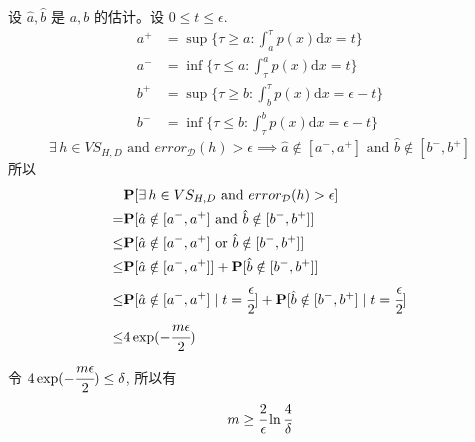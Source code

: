 \documentclass[11pt,letter,notitlepage]{article}
\begin{document}
\begin{solution}
    设 $\hat{a}, \hat{b}$ 是 $a,b$ 的估计。设 $0\leq t\leq \epsilon$.
    $$\begin{aligned}
            a^+ & =\sup \{\tau \geq a : \int_a^\tau p(x)\text{d}x=t\}          \\
            a^- & =\inf \{\tau \leq a : \int_\tau^a p(x)\text{d}x=t\}          \\
            b^+ & =\sup \{\tau \geq b : \int_b^\tau p(x)\text{d}x=\epsilon-t\} \\
            b^- & =\inf \{\tau \leq b : \int_\tau^b p(x)\text{d}x=\epsilon-t\}
        \end{aligned}$$
    $$\exists\, h\in VS_{H,D} \mbox{ and } error_{\mathcal{D}}(h)>\epsilon
        \implies
        \hat{a}\notin [a^-,a^+] \mbox{ and } \hat{b}\notin [b^-,b^+]$$
    所以
    $$\begin{aligned}
                 & \mathbf{P}[\exists\, h\in VS_{H,D} \mbox{ and } error_{\mathcal{D}}(h)>\epsilon]                                          \\
            =    & \mathbf{P} [\hat{a}\notin [a^-,a^+] \mbox{ and } \hat{b}\notin [b^-,b^+]]                          \\
            \leq & \mathbf{P} [\hat{a}\notin [a^-,a^+] \mbox{ or } \hat{b}\notin [b^-,b^+]]                          \\
            \leq &\mathbf{P} [\hat{a}\notin [a^-,a^+]] + \mathbf{P} [\hat{b}\notin [b^-,b^+]] \\
            \leq &\mathbf{P} [\hat{a}\notin [a^-,a^+] \mid t=\cfrac{\epsilon}{2}] + \mathbf{P} [\hat{b}\notin [b^-,b^+] \mid t=\cfrac{\epsilon}{2}] \\
            \leq & 4 \exp(-\cfrac{m\epsilon}{2})
        \end{aligned}$$
        令 $4 \exp(-\cfrac{m\epsilon}{2}) \leq \delta$, 所以有 
        $$m\geq \cfrac{2}{\epsilon} \ln \cfrac{4}{\delta}$$
\end{solution}

\newpage
\end{document}

